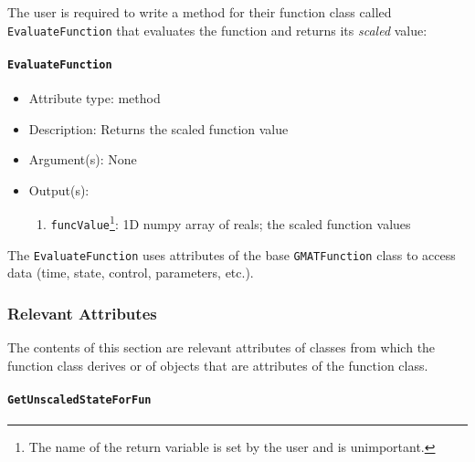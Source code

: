 \documentclass[]{article}
\begin{document}
The user is required to write a method for their function class called \texttt{EvaluateFunction} that evaluates the function and returns its \emph{scaled} value:

\paragraph{\texttt{EvaluateFunction}}

\begin{itemize}
	\item Attribute type: method
	\item Description: Returns the scaled function value
	\item Argument(s): None
	\item Output(s):
	\begin{enumerate}
		\item \texttt{funcValue}\footnote{The name of the return variable is set by the user and is unimportant.}: 1D numpy array of reals; the scaled function values
	\end{enumerate}
\end{itemize}

The \texttt{EvaluateFunction} uses attributes of the base \texttt{GMATFunction} class to access data (time, state, control, parameters, etc.).

\subsubsection{Relevant Attributes}

The contents of this section are relevant attributes of classes from which the function class derives or of objects that are attributes of the function class.

\paragraph{\texttt{GetUnscaledStateForFun}}
\end{document}
